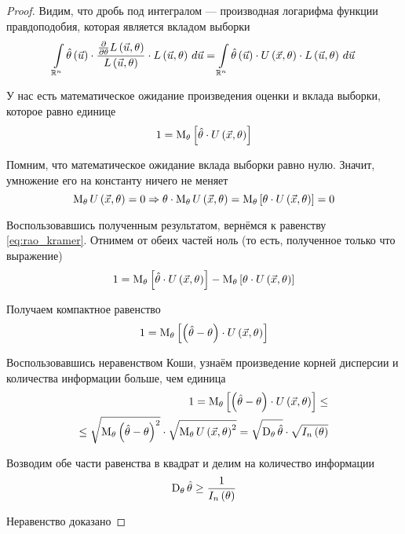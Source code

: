 \begin{proof}
    Видим, что дробь под интегралом --- производная логарифма
    функции правдоподобия, которая является вкладом выборки
    $$\integral{\mathbb{R}^n}{}{\vec{u}}{\hat{\theta}\left( \vec{u} \right)
        \cdot \frac{
            \frac{\partial}{\partial \theta}L\left( \vec{u},\theta \right)}
            {L\left( \vec{u},\theta \right)}
                \cdot L\left( \vec{u},\theta \right)}
        = \integral{\mathbb{R}^n}{}{\vec{u}}{\hat{\theta}\left( \vec{u} \right)
            \cdot
                U\left( \vec{x},\theta \right)
                    \cdot L\left( \vec{u},\theta \right)}$$

    У нас есть математическое ожидание произведения оценки и вклада выборки,
    которое равно единице
    \begin{equation}\label{eq:rao_kramer}
        1 = \Meanof{\theta}{\hat{\theta}\cdot U\left( \vec{x},\theta \right)}
    \end{equation}

    Помним, что математическое ожидание вклада выборки равно нулю.
    Значит, умножение его на константу ничего не меняет
    $$\meanof{\theta}{U\left( \vec{x},\theta \right)}=0
        \Rightarrow 
        \theta\cdot\meanof{\theta}{U\left( \vec{x},\theta \right)}
        = \Meanof{\theta}{\theta\cdot U\left(\vec{x},\theta\right)}
        = 0$$

    Воспользовавшись полученным результатом,
    вернёмся к равенству \eqref{eq:rao_kramer}.
    Отнимем от обеих частей ноль (то есть, полученное только что выражение)
    $$1 = \Meanof{\theta}{\hat{\theta}\cdot U\left( \vec{x},\theta \right)}
        - \Meanof{\theta}{\theta\cdot U\left(\vec{x},\theta\right)}$$

    Получаем компактное равенство
    $$1 = \Meanof{\theta}{\left(\hat{\theta}-\theta\right)
        \cdot U\left( \vec{x},\theta \right)}$$

    Воспользовавшись неравенством Коши, узнаём
    произведение корней дисперсии и количества информации больше, чем единица
    \begin{equation}\label{eq:rao_kramer_koshi}
        \begin{split}
        1 = \meanof{\theta}{
            \left[\left(\hat{\theta}-\theta\right)
                \cdot U\left( \vec{x},\theta \right)\right]} \le \\
        \le \sqrt{\meanof{\theta}{
            \left(\hat{\theta}-\theta\right)^2}}
            \cdot\sqrt{\meanof{\theta}{U\left( \vec{x},\theta \right)^2}}
        = \sqrt{\dispersionof{\theta}{\hat{\theta}}}
            \cdot\sqrt{I_n\left(\theta\right)}
        \end{split}
    \end{equation}

    Возводим обе части равенства в квадрат и делим на количество информации
    $$\dispersionof{\theta}{\hat{\theta}}\ge \frac{1}{I_n\left(\theta\right)}$$

    Неравенство доказано
\end{proof}
